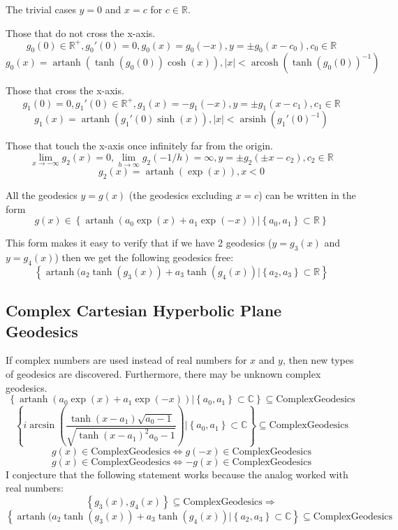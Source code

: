 \documentclass[]{article}
\DeclareMathOperator{\arsinh}{arsinh}
\DeclareMathOperator{\arcosh}{arcosh}
\DeclareMathOperator{\artanh}{artanh}
\newcommand{\pqty}[1]{{\left(#1\right)}}
\newcommand{\Bqty}[1]{{\left\{#1\right\}}}
\newcommand{\abs}[1]{{\left\lvert#1\right\rvert}}
\numberwithin{equation}{section}
\begin{document}
	The trivial cases $y=0$ and $x=c$ for $c\in\mathbb{R}$.
	
	Those that do not cross the x-axis.
	$$g_0(0)\in\mathbb{R}^+,g_0'(0)=0,g_0(x)=g_0(-x),y=\pm g_0(x-c_0),c_0\in\mathbb{R}$$
	$$g_0(x)=\artanh(\tanh(g_0(0))\cosh(x)),\abs{x}<\arcosh(\tanh(g_0(0))^{-1})$$
	
	Those that cross the x-axis. 
	$$g_1(0)=0,g_1'(0)\in\mathbb{R}^+,g_1(x)=-g_1(-x),y=\pm g_1(x-c_1),c_1\in\mathbb{R}$$
	$$g_1(x)=\artanh(g_1'(0)\sinh(x)),\abs{x}<\arsinh(g_1'(0)^{-1})$$
	
	Those that touch the x-axis once infinitely far from the origin.
	$$\lim_{x\to -\infty}g_2(x)=0,\lim_{h\to\infty}g_2(-1/h)=\infty,y=\pm g_2(\pm x-c_2),c_2\in\mathbb{R}$$
	$$g_2(x)=\artanh(\exp(x)),x<0$$
	
	All the geodesics $y=g\pqty{x}$ (the geodesics excluding $x=c$) can be written in the form
	$$g\pqty{x}\in\Bqty{\artanh(a_0\exp(x)+a_1\exp(-x))|\Bqty{a_0,a_1}\subset\mathbb{R}}$$
	
	This form makes it easy to verify that if we have 2 geodesics ($y=g_3\pqty{x}$ and $y=g_4\pqty{x}$) then we get the following geodesics free:
	$$\Bqty{\artanh(a_2\tanh\pqty{g_3\pqty{x}}+a_3\tanh\pqty{g_4\pqty{x}}|\Bqty{a_2,a_3}\subset\mathbb{R}}$$

	\subsection{Complex Cartesian Hyperbolic Plane Geodesics}
	If complex numbers are used instead of real numbers for $x$ and $y$, then new types of geodesics are discovered. Furthermore, there may be unknown complex geodesics.
	$$\Bqty{\artanh(a_0\exp(x)+a_1\exp(-x))|\Bqty{a_0,a_1}\subset\mathbb{C}}\subseteq\text{ComplexGeodesics}$$
	$$\Bqty{i\arcsin\pqty{\frac{\tanh\pqty{x-a_1}\sqrt{a_0-1}}{\sqrt{\tanh\pqty{x-a_1}^2a_0-1}}}|\Bqty{a_0,a_1}\subset\mathbb{C}}\subseteq\text{ComplexGeodesics}$$
	$$g\pqty{x}\in\text{ComplexGeodesics}\Leftrightarrow g\pqty{-x}\in\text{ComplexGeodesics}$$
	$$g\pqty{x}\in\text{ComplexGeodesics}\Leftrightarrow -g\pqty{x}\in\text{ComplexGeodesics}$$
	I conjecture that the following statement works because the analog worked with real numbers:
	$$\Bqty{g_3\pqty{x},g_4\pqty{x}}\subseteq\text{ComplexGeodesics}\Rightarrow$$
	$$\Bqty{\artanh(a_2\tanh\pqty{g_3\pqty{x}}+a_3\tanh\pqty{g_4\pqty{x}}|\Bqty{a_2,a_3}\subset\mathbb{C}}\subseteq\text{ComplexGeodesics}$$
\end{document}
